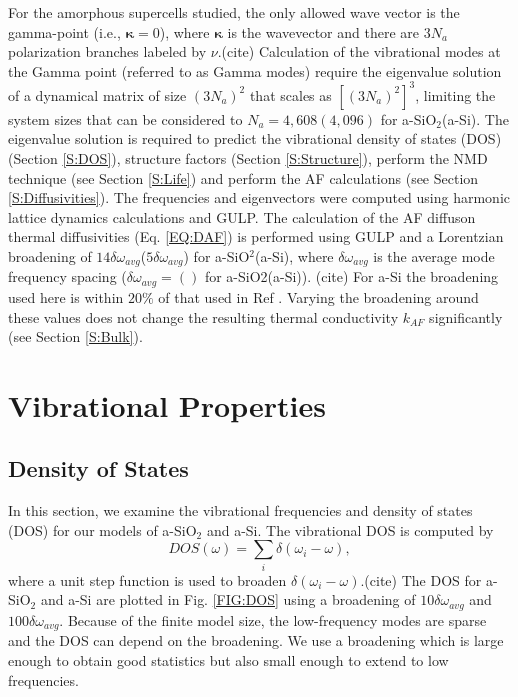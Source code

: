\documentclass[aps,prb,onecolumn,preprint,superscriptaddress,footinbib,amsmath,amssymb,floatfix]{revtex4}
\begin{document}
For the amorphous supercells studied,
the only allowed wave vector is the gamma-point (i.e., $\pmb{\kappa}=0$),  
where $\pmb{\kappa}$ is the wavevector and there are $3N_a$ polarization 
branches labeled by $\nu$.(cite) 
Calculation of the 
vibrational modes at the Gamma point (referred to as Gamma modes) 
require the eigenvalue solution 
of a dynamical matrix of size 
$(3N_a)^2$ that scales as $[(3N_a)^2]^3$, limiting the system 
sizes that can be considered to $N_a = 4,608(4,096)$ for 
a-SiO$_2$(a-Si). 
The eigenvalue solution is required to predict the vibrational 
density of states (DOS) (Section \ref{S:DOS}), structure factors 
(Section \ref{S:Structure}), perform the NMD technique  
(see Section \ref{S:Life})  
and perform the AF calculations (see Section \ref{S:Diffusivities}). 
The frequencies and eigenvectors were computed using harmonic
lattice dynamics calculations and GULP.\cite{gale_general_2003} 
The calculation of the AF diffuson thermal diffusivities 
(Eq. \eqref{EQ:DAF}) 
is performed using GULP and a Lorentzian 
broadening of $14\delta\omega_{avg}$($5\delta\omega_{avg}$) for 
a-SiO$^2$(a-Si), where $\delta\omega_{avg}$ is the average mode 
frequency spacing ($\delta\omega_{avg} = ()$ for a-SiO2(a-Si)).
(cite) For a-Si the broadening used here is within 
$20\%$ of that used 
in Ref . 
Varying the broadening around these values does not 
change the resulting thermal conductivity $k_{AF}$ significantly 
(see Section \ref{S:Bulk}). 

\section{\label{S:Vibrational}Vibrational Properties}

\subsection{\label{S:DOS}Density of States}

In this section, we examine the vibrational frequencies and 
density of states (DOS) for our models of a-SiO$_2$ and a-Si. 
The vibrational DOS is computed by 
\begin{equation}\label{EQ:DOS}
DOS(\omega) = \sum_i \delta(\omega_i - \omega),
\end{equation}
where a unit step function is used to broaden 
$\delta(\omega_i - \omega)$.(cite)  
The DOS for a-SiO$_2$ and a-Si are plotted in Fig. \ref{FIG:DOS} 
using a broadening of $10\delta\omega_{avg}$ and $100\delta\omega_{avg}$.  
Because of the finite model size, the low-frequency modes are sparse and 
the DOS can depend on the broadening.
\cite{feldman_numerical_1999} We use a broadening which is large enough 
to obtain good statistics but also small enough to extend 
to low frequencies.  
\end{document}
